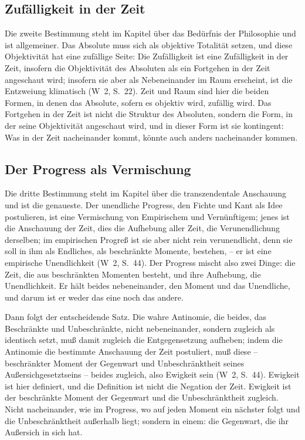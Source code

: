 \documentclass[11pt,a4paper]{article}
\newcommand{\Werke}[1]{(W~2, S.~#1)}
\begin{document}
\subsection{Zufälligkeit in der Zeit}

Die zweite Bestimmung steht im Kapitel über das Bedürfnis der Philosophie und ist allgemeiner. Das Absolute muss sich als objektive Totalität setzen, und diese Objektivität hat eine zufällige Seite: \glqq Die Zufälligkeit ist eine Zufälligkeit in der Zeit, insofern die Objektivität des Absoluten als ein Fortgehen in der Zeit angeschaut wird; insofern sie aber als Nebeneinander im Raum erscheint, ist die Entzweiung klimatisch\grqq{} \Werke{22}. Zeit und Raum sind hier die beiden Formen, in denen das Absolute, sofern es objektiv wird, zufällig wird. Das Fortgehen in der Zeit ist nicht die Struktur des Absoluten, sondern die Form, in der seine Objektivität angeschaut wird, und in dieser Form ist sie kontingent: Was in der Zeit nacheinander kommt, könnte auch anders nacheinander kommen.

\subsection{Der Progress als Vermischung}

Die dritte Bestimmung steht im Kapitel über die transzendentale Anschauung und ist die genaueste. Der unendliche Progress, den Fichte und Kant als Idee postulieren, ist \glqq eine Vermischung von Empirischem und Vernünftigem; jenes ist die Anschauung der Zeit, dies die Aufhebung aller Zeit, die Verunendlichung derselben; im empirischen Progreß ist sie aber nicht rein verunendlicht, denn sie soll in ihm als Endliches, als beschränkte Momente, bestehen, -- er ist eine empirische Unendlichkeit\grqq{} \Werke{44}. Der Progress mischt also zwei Dinge: die Zeit, die aus beschränkten Momenten besteht, und ihre Aufhebung, die Unendlichkeit. Er hält beides nebeneinander, den Moment und das Unendliche, und darum ist er weder das eine noch das andere.

Dann folgt der entscheidende Satz. \glqq Die wahre Antinomie, die beides, das Beschränkte und Unbeschränkte, nicht nebeneinander, sondern zugleich als identisch setzt, muß damit zugleich die Entgegensetzung aufheben; indem die Antinomie die bestimmte Anschauung der Zeit postuliert, muß diese -- beschränkter Moment der Gegenwart und Unbeschränktheit seines Außersichgesetztseins -- beides zugleich, also Ewigkeit sein\grqq{} \Werke{44}. Ewigkeit ist hier definiert, und die Definition ist nicht die Negation der Zeit. Ewigkeit ist der beschränkte Moment der Gegenwart und die Unbeschränktheit zugleich. Nicht nacheinander, wie im Progress, wo auf jeden Moment ein nächster folgt und die Unbeschränktheit außerhalb liegt; sondern in einem: die Gegenwart, die ihr Außersich in sich hat.
\end{document}
